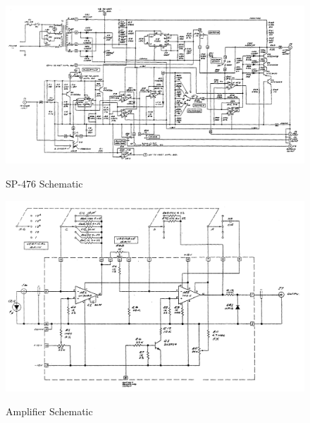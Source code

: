 \documentclass[12pt]{report}
\begin{document}
\begin{appendices}
\chapter[Schematics]{}

\begin{figure}
  \centering
	\includegraphics[width=\textwidth]{driver_schm.png}\\
	\caption[SP-476 Schematic]{SP-476 Schematic~\cite{sfpidriver}}
	\label{fig:driverschm}
\end{figure}

\begin{figure}
  \centering
	\includegraphics[width=\textwidth]{amp_schm.png}\\
	\caption[Amplifier Schematic]{Amplifier Schematic~\cite{sfpidriver}}
	\label{fig:ampschm}
\end{figure}

\end{appendices}


\printnomenclature
\end{document}
